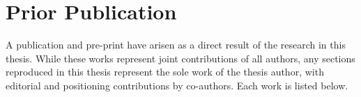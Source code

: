 \documentclass[
  fontsize=12pt,
  titlepage=firstiscover,
  paper=letter,
  oneside,
  cleardoublepage=plain,
  parskip=half-,
  DIV=10,
  parindent,
  appendixprefix,
  chapterprefix,
  listof=totoc,
]{scrbook}
\begin{document}
\endgroup
\cleardoublepage%





\chapter*{Prior Publication}%
%
\begingroup
\small
A publication and pre-print have arisen as a direct result of the research in this thesis.
While these works represent joint contributions of all authors, any sections reproduced in
this thesis represent the sole work of the thesis author, with editorial and positioning
contributions by co-authors. Each work is listed below.
\end{document}

